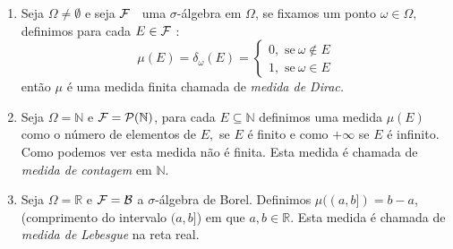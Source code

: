 \begin{frame}
\begin{exem}

\begin{enumerate}
\item  Seja $\Omega \neq \emptyset $ e seja ${\cal F}$ $\ $ uma $\sigma$-álgebra em $\Omega $, se fixamos um ponto $\omega\in \Omega ,$ definimos para cada $E\in {\cal F}$ : 
\begin{equation*}
\mu (E)=\delta_{\omega}(E)=\left\{ 
\begin{array}{c}
0,\text{ se} \ \omega\notin E \\ 
1,\text{ se}\ \omega\in E
\end{array}
\right.
\end{equation*} então $\mu $ é uma medida finita chamada de \emph{ medida de Dirac.}

\item  Seja $\Omega =\mathbb{N}$ e ${\cal F}=\mathcal{P}(\mathbb{N})$, para
cada $E\subseteq \mathbb{N}$ definimos uma medida $\mu (E)$ como o
n\'{u}mero de elementos de $E,$ se $E$  é finito e como $+\infty $ se $E$ é
infinito. Como podemos ver esta medida não é finita. Esta medida é chamada de \emph{medida de contagem} em  $\mathbb{N}.$

\item Seja $\Omega =\mathbb{R}$ e ${\cal F} = {\cal B}$ a $\sigma$-álgebra de Borel. Definimos $\mu((a, b]) = b - a$, (comprimento do
intervalo $(a,b]$) em que $a, b \in  \mathbb{R}.$ Esta medida é chamada de {\it medida de Lebesgue} na reta real.

\end{enumerate}
\end{exem}

\end{frame}

